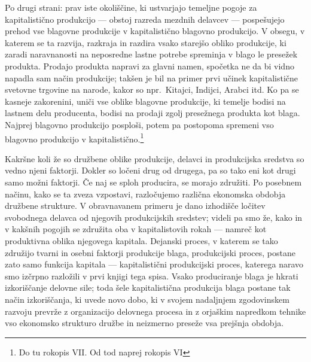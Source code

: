 \documentclass[kapital_02.tex]{subfiles}
\begin{document}
Po drugi strani: prav iste okoliščine, ki ustvarjajo temeljne pogoje za kapitalistično produkcijo --- obstoj razreda mezdnih delavcev --- pospešujejo prehod vse blagovne produkcije v kapitalistično blagovno produkcijo. V obsegu, v katerem se ta razvija, razkraja in razdira vsako starejšo obliko produkcije, ki zaradi naravnanosti na neposredne lastne potrebe spreminja v blago le presežek produkta. Prodajo produkta napravi za glavni namen, spočetka ne da bi vidno napadla sam način produkcije; takšen je bil na primer prvi učinek kapitalistične svetovne trgovine na narode, kakor so npr.\ Kitajci, Indijci, Arabci itd. Ko pa se kasneje zakorenini, uniči vse oblike blagovne produkcije, ki temelje bodisi na lastnem delu producenta, bodisi na prodaji zgolj presežnega produkta kot blaga. Najprej blagovno produkcijo posploši, potem pa postopoma spremeni vso blagovno produkcijo v kapitalistično.\footnote{Do tu rokopis VII. Od tod naprej rokopis VI}

Kakršne koli že so družbene oblike produkcije, delavci in produkcijska sredstva so vedno njeni faktorji. Dokler so ločeni drug od drugega, pa so tako eni kot drugi samo možni faktorji. Če naj se sploh producira, se morajo združiti. Po posebnem načinu, kako se ta zveza vzpostavi, razločujemo različna ekonomska obdobja družbene strukture. V obravnavanem primeru je dano izhodišče ločitev svobodnega delavca od njegovih produkcijskih sredstev; videli pa smo že, kako in v kakšnih pogojih se združita oba v kapitalistovih rokah --- namreč kot produktivna oblika njegovega kapitala. Dejanski proces, v katerem se tako združijo tvarni in osebni faktorji produkcije blaga, produkcijski proces, postane zato samo funkcija kapitala --- kapitalistični produkcijski proces, katerega naravo smo izčrpno razložili v prvi knjigi tega spisa. Vsako produciranje blaga je hkrati izkoriščanje delovne sile; toda šele kapitalistična produkcija blaga postane tak način izkoriščanja, ki uvede novo dobo, ki v svojem nadaljnjem zgodovinskem razvoju prevrže z organizacijo delovnega procesa in z orjaškim napredkom tehnike vso ekonomsko strukturo družbe in neizmerno preseže vsa prejšnja obdobja.
\end{document}
